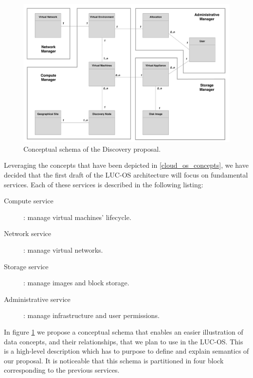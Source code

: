 
\begin{figure}
	\centering
	\includegraphics[width=0.91\linewidth]{Figures/mcd_3.pdf}
	\caption{Conceptual schema of the Discovery proposal.}%
	\label{fig:mcd}%
\end{figure}

Leveraging the concepts that have been depicted in \ref{cloud_os_concepts}, we 
have decided that the first draft of the LUC-OS architecture will focus on 
fundamental services. Each of these services is described in the following 
listing:

\label{sub:sec:list_services}

\begin{description}

	\item [Compute service] : manage virtual machines' lifecycle.

	\item [Network service] : manage virtual networks.

	\item [Storage service] : manage images and block storage.

	\item [Administrative service] : manage infrastructure and user permissions.  

\end{description}

In figure \ref{fig:mcd} we propose a conceptual schema that enables an easier 
illustration of data concepts, and their relationships, that we plan to use in
the LUC-OS. This is a high-level description which has to purpose to define and 
explain semantics of our proposal. It is noticeable that this schema is 
partitioned in four block corresponding to the previous services.

